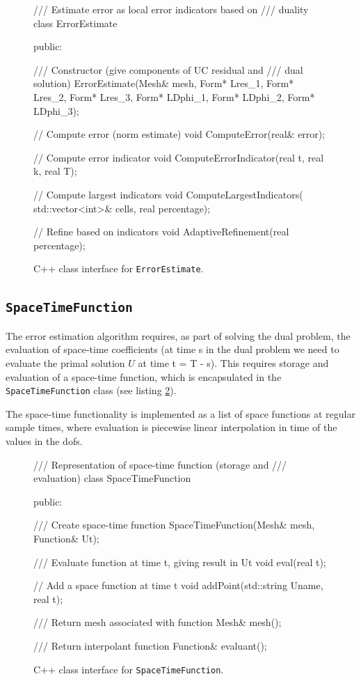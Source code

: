 \begin{figure}[!h]
{\small
\begin{c++}
/// Estimate error as local error indicators based on
/// duality
class ErrorEstimate
{
public:

  /// Constructor (give components of UC residual and
  /// dual solution)
  ErrorEstimate(Mesh& mesh,
		Form* Lres_1,
		Form* Lres_2,
		Form* Lres_3,
		Form* LDphi_1,
		Form* LDphi_2,
		Form* LDphi_3);

  // Compute error (norm estimate)
  void ComputeError(real& error);

  // Compute error indicator
  void ComputeErrorIndicator(real t, real k,
                             real T);

  // Compute largest indicators
  void ComputeLargestIndicators(
    std::vector<int>& cells,
    real percentage);
  
  // Refine based on indicators
  void AdaptiveRefinement(real percentage);
}
\end{c++}
}
\caption{
C++ class interface for {\tt ErrorEstimate}.
}
\label{code:ErrorEstimate}
\end{figure}

\subsection{\tt SpaceTimeFunction}

The error estimation algorithm requires, as part of solving the dual
problem, the evaluation of space-time coefficients (at time s in the
dual problem we need to evaluate the primal solution $U$ at time t = T
- s). This requires storage and evaluation of a space-time function,
which is encapsulated in the {\tt SpaceTimeFunction} class (see
listing \ref{code:SpaceTimeFunction}).

The space-time functionality is implemented as a list of space
functions at regular sample times, where evaluation is piecewise
linear interpolation in time of the values in the dofs.


\begin{figure}[!h]
{\small
\begin{c++}
/// Representation of space-time function (storage and
/// evaluation)
class SpaceTimeFunction
{
public:

  /// Create space-time function
  SpaceTimeFunction(Mesh& mesh, Function& Ut);

  /// Evaluate function at time t, giving result in Ut
  void eval(real t);

  // Add a space function at time t
  void addPoint(std::string Uname, real t);

  /// Return mesh associated with function
  Mesh& mesh();

  /// Return interpolant function
  Function& evaluant();
}
\end{c++}
}
\caption{
C++ class interface for {\tt SpaceTimeFunction}.
}
\label{code:SpaceTimeFunction}
\end{figure}



